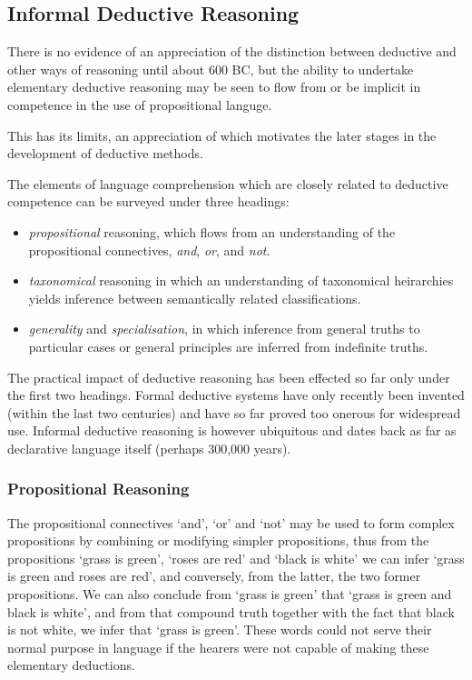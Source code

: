 \documentclass[10pt,titlepage]{book}
\begin{document}
\subsection{Informal Deductive Reasoning}

There is no evidence of an appreciation of the distinction between deductive and other ways of reasoning until about 600 BC, but the ability to undertake elementary deductive reasoning may be seen to flow from or be implicit in competence in the use of propositional languge.

This has its limits, an appreciation of which motivates the later stages in the development of deductive methods.

The elements of language comprehension which are closely related to deductive competence can be surveyed under three headings:
\begin{itemize}
\item \emph{propositional} reasoning, which flows from an understanding of the propositional connectives, \emph{and}, \emph{or}, and \emph{not}.
\item \emph{taxonomical} reasoning in which an understanding of taxonomical heirarchies yields inference between semantically related classifications.
\item \emph{generality} and \emph{specialisation}, in which inference from general truths to particular cases or general principles are inferred from indefinite truths.
\end{itemize}

The practical impact of deductive reasoning has been effected so far only under the first two headings.
Formal deductive systems have only recently been invented (within the last two centuries) and have so far proved too onerous for widespread use.
Informal deductive reasoning is however ubiquitous and dates back as far as declarative language itself (perhaps 300,000 years).

\subsubsection{Propositional Reasoning}

The propositional connectives `and', `or' and `not' may be used to form complex propositions by combining or modifying simpler propositions, thus from the propositions `grass is green', `roses are red' and `black is white' we can infer `grass is green and roses are red', and conversely, from the latter, the two former propositions.
We can also conclude from `grass is green' that `grass is green and black is white', and from that compound truth together with the fact that black is not white, we infer that `grass is green'.
These words could not serve their normal purpose in language if the hearers were not capable of making these elementary deductions.
\end{document}
